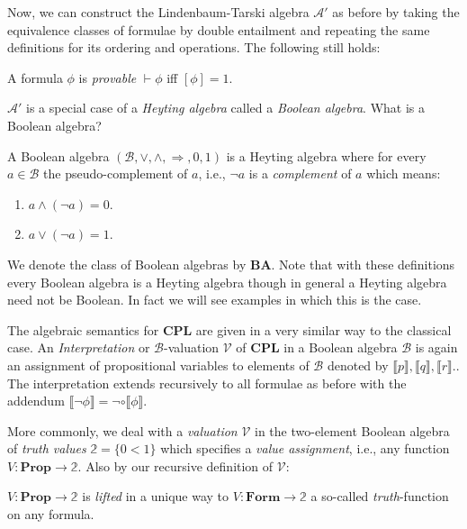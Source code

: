 		Now, we can construct the Lindenbaum-Tarski algebra $\mathcal{A'}$ as before by taking the equivalence classes of formulae by double entailment and repeating the same definitions for its ordering and operations. 
		The following still holds:
		\begin{prop}
			A formula $\phi$ is \emph{provable} $\vdash \phi$ iff $[\phi] = 1$.
		\end{prop}
		$\mathcal{A'}$ is a special case of a \emph{Heyting algebra} called a \emph{Boolean algebra}. \newline
		What is a Boolean algebra? 
		\begin{definition}
			A Boolean algebra $(\mathcal{B}, \lor, \land, \Rightarrow, 0, 1)$ is a Heyting algebra where for every $a \in \mathcal{B}$ the pseudo-complement of $a$, i.e., $\neg a$ is a \emph{complement} of $a$ which means:
			\begin{enumerate}
				\item $a \land (\neg a) = 0$.
				\item $a \lor (\neg a) = 1$. 
			\end{enumerate}
		\end{definition}
				
		We denote the class of Boolean algebras by $\mathbf{BA}$. \newline
	\newline
		 			Note that with these definitions
		 					every Boolean algebra is a Heyting algebra though in general a Heyting algebra need not be Boolean. In fact we will see examples in which this is the case.
		 			
		The algebraic semantics for \textbf{CPL} are given in a very similar way to the classical case.
		An \emph{Interpretation}  or $\mathcal{B}$-valuation $\mathcal{V}$ of \textbf{CPL} in a Boolean algebra $\mathcal{B}$ is again an assignment of propositional variables to elements of $\mathcal{B}$ denoted by $\llbracket p \rrbracket, \llbracket q \rrbracket, \llbracket r \rrbracket$.. The interpretation extends recursively to all formulae as before with the addendum $\llbracket \neg \phi \rrbracket = \neg \circ \llbracket \phi \rrbracket$.
		
		More commonly, we deal with a \emph{valuation} $\mathcal{V}$ in the two-element Boolean algebra of \emph{truth values} $\mathbb{2}=\{0 < 1\}$ which specifies a \emph{value assignment}, i.e., any function $V : \textbf{Prop} \rightarrow \mathbb{2}$. Also by our recursive definition of $\mathcal{V}$:
		
		\begin{remark}
			$V : \textbf{Prop} \rightarrow \mathbb{2}$ is \emph{lifted} in a unique way to $V : \textbf{Form} \rightarrow \mathbb{2}$ a so-called \emph{truth}-function on any formula.
		\end{remark}

